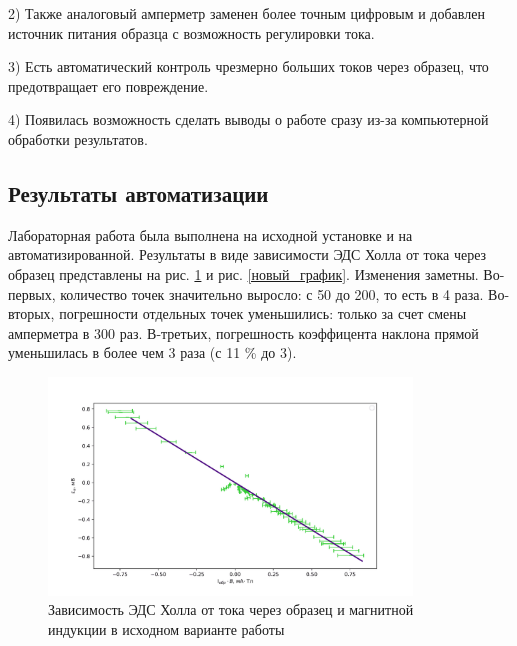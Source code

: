 \documentclass[a4paper,12pt]{article} %
\begin{document}
2) Также аналоговый амперметр заменен более точным цифровым и добавлен источник питания образца с возможность регулировки тока. 

3) Есть автоматический контроль чрезмерно больших токов через образец, что предотвращает его повреждение. 

4) Появилась возможность сделать выводы о работе сразу из-за компьютерной обработки результатов.



\subsection*{Результаты автоматизации}
Лабораторная работа была выполнена на исходной установке и на автоматизированной. Результаты в виде зависимости ЭДС Холла от тока через образец представлены на рис. \ref{старый_график} и рис. \ref{новый_график}. 
Изменения заметны. Во-первых, количество точек значительно выросло: с 50 до 200, то есть в 4 раза. Во-вторых, погрешности отдельных точек уменьшились: только за счет смены амперметра в 300 раз. В-третьих, погрешность коэффицента наклона прямой уменьшилась в более чем 3 раза (с 11 \% до 3).

\begin{figure}[h!]
\begin{center}
\includegraphics[width=0.86\textwidth]{Старая}
\caption{Зависимость ЭДС Холла от тока через образец и магнитной индукции в исходном варианте работы} \label{старый_график}
\end{center}
\end{figure}
\end{document}
